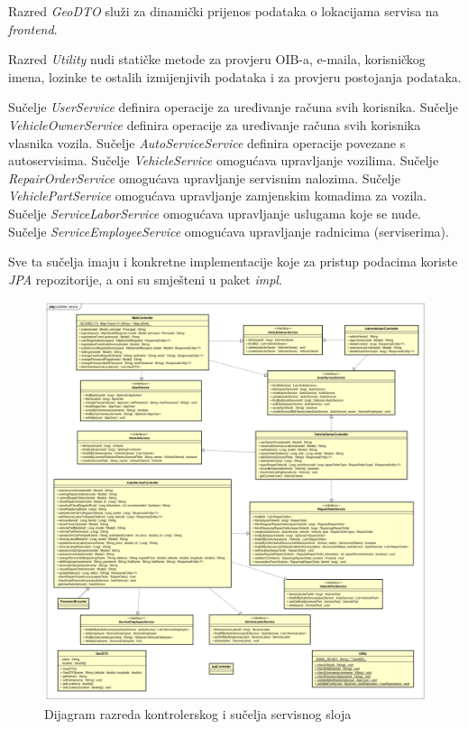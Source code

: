 		Razred \textit{GeoDTO} služi za dinamički prijenos podataka o lokacijama servisa na \textit{frontend}.
		
		Razred \textit{Utility} nudi statičke metode za provjeru OIB-a, e-maila, korisničkog imena, lozinke te ostalih izmijenjivih podataka i za provjeru postojanja podataka.
		
		Sučelje \textit{UserService} definira operacije za uređivanje računa svih korisnika. Sučelje \textit{VehicleOwnerService} definira operacije za uređivanje računa svih korisnika vlasnika vozila. Sučelje \textit{AutoServiceService} definira operacije povezane s autoservisima. Sučelje \textit{VehicleService} omogućava upravljanje vozilima. Sučelje \textit{RepairOrderService} omogućava upravljanje servisnim nalozima. Sučelje \textit{VehiclePartService} omogućava upravljanje zamjenskim komadima za vozila. Sučelje \textit{ServiceLaborService} omogućava upravljanje uslugama koje se nude. Sučelje \textit{ServiceEmployeeService} omogućava upravljanje radnicima (serviserima).
		
		Sve ta sučelja imaju i konkretne implementacije koje za pristup podacima koriste \textit{JPA} repozitorije, a oni su smješteni u paket \textit{impl}.
				
		
		\begin{figure}[H]
			\centering
			\includegraphics[width=1.0\linewidth]{dijagrami/class_diagram_controller_service.png}
			\caption{Dijagram razreda kontrolerskog i sučelja servisnog sloja}
			\label{fig:classdiagramcontrolservice}
		\end{figure}
	
